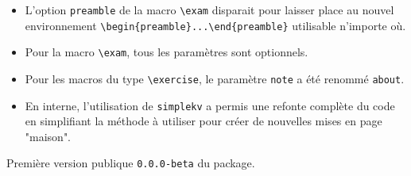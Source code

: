\documentclass[12pt,a4paper]{scrartcl}
\theoremstyle{definition}
\begin{document}
\begin{description}[leftmargin=1em]
\begin{itemize}
        \item L'option \verb+preamble+ de la macro \verb+\exam+ disparait pour laisser place au nouvel environnement \verb+\begin{preamble}...\end{preamble}+ utilisable n'importe où.

        \item Pour la macro \verb+\exam+, tous les paramètres sont optionnels.

        \item Pour les macros du type \verb+\exercise+, le paramètre \verb+note+ a été renommé \verb+about+.

        \item En interne, l'utilisation de \verb+simplekv+ a permis une refonte complète du code en simplifiant la méthode à utiliser pour créer de nouvelles mises en page "maison".
    \end{itemize}

    \item[2017-11-03] Première version publique \verb+0.0.0-beta+ du package.
\end{description}
\end{document}
